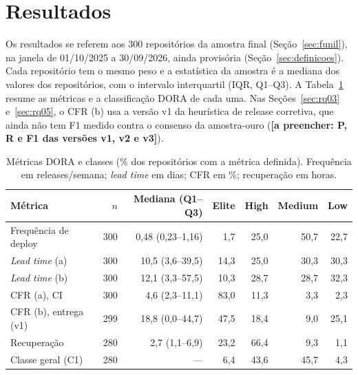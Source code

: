 %

\providecommand{\apreencher}[1]{\textbf{[a preencher: #1]}}

\section{Resultados}
\label{sec:resultados}

Os resultados se referem aos 300 repositórios da amostra final (Seção~\ref{sec:funil}),
na janela de 01/10/2025 a 30/09/2026, ainda provisória (Seção~\ref{sec:definicoes}). Cada
repositório tem o mesmo peso e a estatística da amostra é a mediana dos valores dos
repositórios, com o intervalo interquartil (IQR, Q1--Q3). A Tabela~\ref{tab:descritivo} resume
as métricas e a classificação DORA de cada uma. Nas Seções~\ref{sec:rq03} e~\ref{sec:rq05},
o CFR (b) usa a versão v1 da heurística de release corretiva, que ainda não tem F1 medido
contra o consenso da amostra-ouro (\apreencher{P, R e F1 das versões v1, v2 e v3}).

\begin{table}[ht]
\centering
\small
\caption{Métricas DORA e classes (\% dos repositórios com a métrica definida). Frequência em
releases/semana; \textit{lead time} em dias; CFR em \%; recuperação em horas.}
\label{tab:descritivo}
\begin{tabular}{lrrrrrr}
\hline
Métrica & $n$ & Mediana (Q1--Q3) & Elite & High & Medium & Low \\
\hline
Frequência de deploy      & 300 & 0,48 (0,23--1,16) & 1,7  & 25,0 & 50,7 & 22,7 \\
\textit{Lead time} (a)    & 300 & 10,5 (3,6--39,5)  & 14,3 & 25,0 & 30,3 & 30,3 \\
\textit{Lead time} (b)    & 300 & 12,1 (3,3--57,5)  & 10,3 & 28,7 & 28,7 & 32,3 \\
CFR (a), CI               & 300 & 4,6 (2,3--11,1)   & 83,0 & 11,3 & 3,3  & 2,3  \\
CFR (b), entrega (v1)     & 299 & 18,8 (0,0--44,7)  & 47,5 & 18,4 & 9,0  & 25,1 \\
Recuperação               & 280 & 2,7 (1,1--6,9)    & 23,2 & 66,4 & 9,3  & 1,1  \\
\hline
Classe geral (C1)         & 280 & ---               & 6,4  & 43,6 & 45,7 & 4,3  \\
\hline
\end{tabular}
\end{table}

